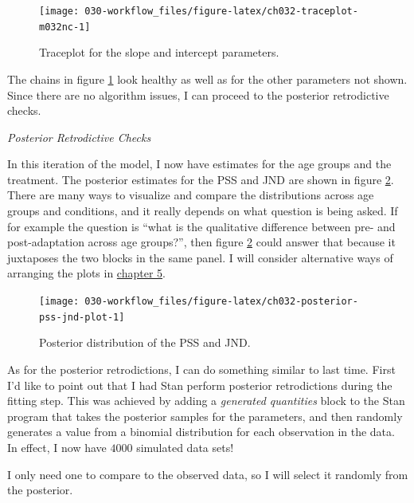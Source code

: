 \documentclass[11pt, oneside, openany]{scrbook}
\begin{document}
\begin{figure}

{\centering \texttt{[image: 030-workflow\_files/figure-latex/ch032-traceplot-m032nc-1]} 

}

\caption{Traceplot for the slope and intercept parameters.}\label{fig:ch032-traceplot-m032nc}
\end{figure}

The chains in figure \ref{fig:ch032-traceplot-m032nc} look healthy as well as for the other parameters not shown. Since there are no algorithm issues, I can proceed to the posterior retrodictive checks.

\emph{Posterior Retrodictive Checks}

In this iteration of the model, I now have estimates for the age groups and the treatment. The posterior estimates for the PSS and JND are shown in figure \ref{fig:ch032-posterior-pss-jnd-plot}. There are many ways to visualize and compare the distributions across age groups and conditions, and it really depends on what question is being asked. If for example the question is ``what is the qualitative difference between pre- and post-adaptation across age groups?'', then figure \ref{fig:ch032-posterior-pss-jnd-plot} could answer that because it juxtaposes the two blocks in the same panel. I will consider alternative ways of arranging the plots in \protect\hyperlink{results}{chapter 5}.

\begin{figure}

{\centering \texttt{[image: 030-workflow\_files/figure-latex/ch032-posterior-pss-jnd-plot-1]} 

}

\caption{Posterior distribution of the PSS and JND.}\label{fig:ch032-posterior-pss-jnd-plot}
\end{figure}

As for the posterior retrodictions, I can do something similar to last time. First I'd like to point out that I had Stan perform posterior retrodictions during the fitting step. This was achieved by adding a \emph{generated quantities} block to the Stan program that takes the posterior samples for the parameters, and then randomly generates a value from a binomial distribution for each observation in the data. In effect, I now have \(4000\) simulated data sets!

I only need one to compare to the observed data, so I will select it randomly from the posterior.
\end{document}
